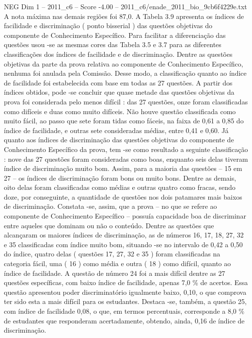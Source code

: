 \begin{textsample}{NEG Dim 1 – 2011\_c6 – Score -4.00 – 2011\_c6/enade\_2011\_bio\_9cb6f4229e.txt}
A nota máxima nas demais regiões foi 87,0.
A Tabela 3.9 apresenta os índices de facilidade e discriminação ( ponto bisserial ) das questões objetivas do componente de Conhecimento Específico.
Para facilitar a diferenciação das questões usou -se as mesmas cores das Tabela 3.5 e 3.7 para as diferentes classificações dos índices de facilidade e de discriminação.
Dentre as questões objetivas da parte da prova relativa ao componente de Conhecimento Específico, nenhuma foi anulada pela Comissão.
Desse modo, a classificação quanto ao índice de facilidade foi estabelecida com base em todas as 27 questões.
A partir dos índices obtidos, pode -se concluir que quase metade das questões objetivas da prova foi considerada pelo menos difícil : das 27 questões, onze foram classificadas como difíceis e duas como muito difíceis.
Não houve questão classificada como muito fácil, ao passo que sete foram tidas como fáceis, na faixa de 0,61 a 0,85 do índice de facilidade, e outras sete consideradas médias, entre 0,41 e 0,60.
Já quanto aos índices de discriminação das questões objetivas do componente de Conhecimento Específico da prova, tem -se como resultado a seguinte classificação : nove das 27 questões foram consideradas como boas, enquanto seis delas tiveram índice de discriminação muito bom.
Assim, para a maioria das questões – 15 em 27 – os índices de discriminação foram bons ou muito bons.
Dentre as demais, oito delas foram classificadas como médias e outras quatro como fracas, sendo doze, por conseguinte, a quantidade de questões nos dois patamares mais baixos de discriminação.
Constata -se, assim, que a prova – no que se refere ao componente de Conhecimento Específico – possuía capacidade boa de discriminar entre aqueles que dominam ou não o conteúdo.
Dentre as questões que alcançaram os maiores índices de discriminação, as de números 16, 17, 18, 27, 32 e 35 classificadas com índice muito bom, situando -se no intervalo de 0,42 a 0,50 do índice, quatro delas ( questões 17, 27, 32 e 35 ) foram classificadas na categoria fácil, uma ( 16 ) como média e outra ( 18 ) como difícil, quanto ao índice de facilidade.
A questão de número 24 foi a mais difícil dentre as 27 questões específicas, com baixo índice de facilidade, apenas 7,0 \% de acertos.
Essa questão apresentou poder discriminatório igualmente baixo, 0,10, o que comprova ter sido esta a mais difícil para os estudantes.
Destaca -se, também, a questão 25, com índice de facilidade 0,08, o que, em termos percentuais, corresponde a 8,0 \% de estudantes que responderam acertadamente, obtendo, ainda, 0,16 de índice de discriminação.

\end{textsample}
